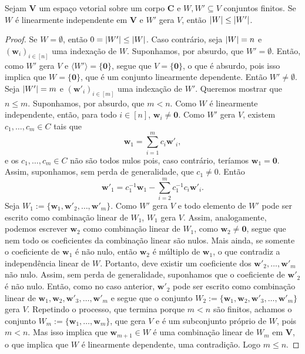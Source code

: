 \begin{prop}
	Sejam $\bm V$ um espaço vetorial sobre um corpo $\bm C$ e $W,W' \subseteq V$ conjuntos finitos. Se $W$ é linearmente independente em $\bm V$ e $W'$ gera $V$, então $\left\vert{W}\right\vert \leq \left\vert{W'}\right\vert$.
\end{prop}
\begin{proof}
	Se $W=\emptyset$, então $0 = \left\vert{W'}\right\vert \leq \left\vert{W}\right\vert$. Caso contrário, seja $\left\vert{W}\right\vert = n$ e $(\bm w_i)_{i \in [n]}$ uma indexação de $W$. Suponhamos, por absurdo, que $W' = \emptyset$. Então, como $W'$ gera $V$ e $\langle W' \rangle = \{\bm 0\}$, segue que $V=\{\bm 0\}$, o que é absurdo, pois isso implica que $W=\{\bm 0\}$, que é um conjunto linearmente dependente. Então $W' \neq \emptyset$.  Seja $\left\vert{W'}\right\vert = m$ e $(\bm w'_i)_{i \in [m]}$ uma indexação de $W'$. Queremos mostrar que $n \leq m$. Suponhamos, por absurdo, que $m < n$. Como $W$ é linearmente independente, então, para todo $i \in [n]$, $\bm w_i \neq \bm 0$. Como $W'$ gera $V$, existem $c_1,\ldots,c_m \in C$ tais que
	\begin{equation*}
	\bm w_1 = \sum_{i=1}^m c_i \bm w'_i,
	\end{equation*}
e os $c_1,\ldots,c_m \in C$  não são todos nulos pois, caso contrário, teríamos $\bm w_1=\bm 0$. Assim, suponhamos,  sem perda de generalidade, que $c_1 \neq 0$. Então
	\begin{equation*}
	\bm w'_1 = c_1^{-1}\bm w_1 - \sum_{i=2}^m c_1^{-1}c_i \bm w'_i.
	\end{equation*}
Seja $W_1 := \{\bm w_1,\bm w'_2,\ldots,\bm w'_m\}$. Como $W'$ gera $V$ e todo elemento de $W'$ pode ser escrito como combinação linear de $W_1$, $W_1$ gera $V$. Assim, analogamente, podemos escrever $\bm w_2$ como combinação linear de $W_1$, como $\bm w_2 \neq \bm 0$, segue que nem todo os coeficientes da combinação linear são nulos. Mais ainda, se somente o coeficiente de $\bm w_1$ é não nulo, então $\bm w_2$ é múltiplo de $\bm w_1$, o que contradiz a independência linear de $W$. Portanto, deve existir um coeficiente dos $\bm w'_2,\ldots,\bm w'_m$ não nulo. Assim, sem perda de generalidade, suponhamos que o coeficiente de $\bm w'_2$ é não nulo. Então, como no caso anterior, $\bm w'_2$ pode ser escrito como combinação linear de $\bm w_1, \bm w_2, \bm w'_3,\ldots, \bm w'_m$ e segue que o conjunto $W_2 := \{\bm w_1, \bm w_2, \bm w'_3,\ldots, \bm w'_m\}$ gera $V$. Repetindo o processo, que termina porque $m<n$ são finitos, achamos o conjunto $W_m := \{\bm w_1, \ldots, \bm w_m\}$, que gera $V$ e é um subconjunto próprio de $W$, pois $m < n$. Mas isso implica que $\bm w_{m+1} \in W$ é uma combinação linear de $W_m$ em $\bm V$, o que implica que $W$ é linearmente dependente, uma contradição. Logo $m \leq n$.
\end{proof}

